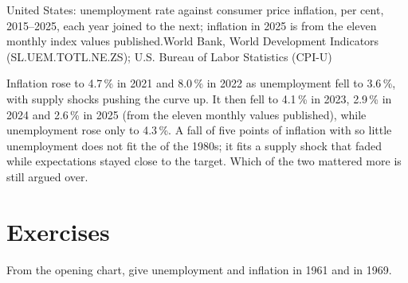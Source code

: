 \begin{omchart}{United States: unemployment rate against consumer price inflation, per cent, 2015--2025, each year joined to the next; inflation in 2025 is from the eleven monthly index values
published.}{World Bank, World Development Indicators
(SL.UEM.TOTL.NE.ZS); U.S. Bureau of Labor Statistics (CPI-U)}
\end{omchart}

\begin{record}[2021--25]
Inflation rose to 4.7\,\% in 2021 and 8.0\,\% in 2022 as unemployment fell to 3.6\,\%, with supply shocks pushing the curve up. It then fell to 4.1\,\% in 2023, 2.9\,\% in 2024
and 2.6\,\% in 2025 (from the eleven monthly values published), while unemployment rose only to 4.3\,\%. A fall of five points of inflation with so little unemployment does not fit the  of the 1980s;
it fits a supply shock that faded while expectations stayed close to the target. Which of the two mattered more is still argued over.
\end{record}

\section{Exercises}

\begin{exercise}[$\star$]\label{exo:g12:phillips-curve:1}
From the opening chart, give unemployment and inflation in 1961 and in 1969.
\end{exercise}

